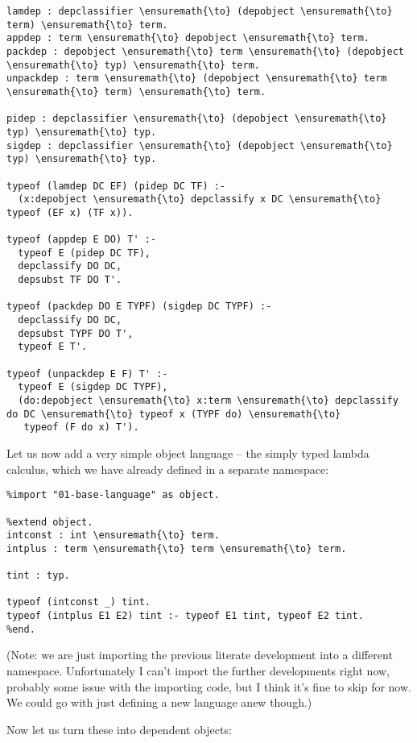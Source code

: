 \begin{verbatim}
lamdep : depclassifier \ensuremath{\to} (depobject \ensuremath{\to} term) \ensuremath{\to} term.
appdep : term \ensuremath{\to} depobject \ensuremath{\to} term.
packdep : depobject \ensuremath{\to} term \ensuremath{\to} (depobject \ensuremath{\to} typ) \ensuremath{\to} term.
unpackdep : term \ensuremath{\to} (depobject \ensuremath{\to} term \ensuremath{\to} term) \ensuremath{\to} term.

pidep : depclassifier \ensuremath{\to} (depobject \ensuremath{\to} typ) \ensuremath{\to} typ.
sigdep : depclassifier \ensuremath{\to} (depobject \ensuremath{\to} typ) \ensuremath{\to} typ.

typeof (lamdep DC EF) (pidep DC TF) :-
  (x:depobject \ensuremath{\to} depclassify x DC \ensuremath{\to} typeof (EF x) (TF x)).

typeof (appdep E DO) T' :-
  typeof E (pidep DC TF),
  depclassify DO DC,
  depsubst TF DO T'.

typeof (packdep DO E TYPF) (sigdep DC TYPF) :-
  depclassify DO DC,
  depsubst TYPF DO T',
  typeof E T'.

typeof (unpackdep E F) T' :-
  typeof E (sigdep DC TYPF),
  (do:depobject \ensuremath{\to} x:term \ensuremath{\to} depclassify do DC \ensuremath{\to} typeof x (TYPF do) \ensuremath{\to}
   typeof (F do x) T').
\end{verbatim}

Let us now add a very simple object language -- the simply typed lambda
calculus, which we have already defined in a separate namespace:

\begin{verbatim}
%import "01-base-language" as object.

%extend object.
intconst : int \ensuremath{\to} term.
intplus : term \ensuremath{\to} term \ensuremath{\to} term.

tint : typ.

typeof (intconst _) tint.
typeof (intplus E1 E2) tint :- typeof E1 tint, typeof E2 tint.
%end.
\end{verbatim}

(Note: we are just importing the previous literate development into a
different namespace. Unfortunately I can't import the further
developments right now, probably some issue with the importing code, but
I think it's fine to skip for now. We could go with just defining a new
language anew though.)

Now let us turn these into dependent objects:

